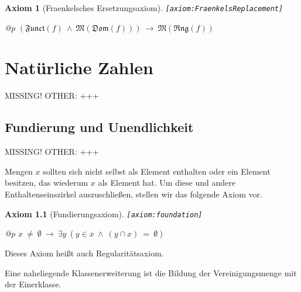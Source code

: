 \documentclass[a4paper,german,10pt,twoside]{book}
\newtheorem{ax}{Axiom}
\theoremstyle{definition}
\theoremstyle{remark}
\begin{document}
\begin{ax}[Fraenkelsches Ersetzungsaxiom]
\label{axiom:FraenkelsReplacement} \hypertarget{axiom:FraenkelsReplacement}{}
{\tt \tiny [\verb]axiom:FraenkelsReplacement]]}
\mbox{}
\begin{longtable}{{@{\extracolsep{\fill}}p{\linewidth}}}
\centering $(\mathfrak{Funct}(f)\ \land\ \mathfrak{M}(\mathfrak{Dom}(f)))\ \rightarrow\ \mathfrak{M}(\mathfrak{Rng}(f))$
\end{longtable}

\end{ax}




\chapter{Nat{\"u}rliche Zahlen} \label{chapter6} \hypertarget{chapter6}{}

MISSING! OTHER: +++

\section{Fundierung und Unendlichkeit} \label{chapter6_section1} \hypertarget{chapter6_section1}{}
MISSING! OTHER: +++

\par
Mengen $x$ sollten sich nicht selbst als Element enthalten oder ein Element besitzen, das wiederum
$x$ als Element hat. Um diese und andere Enthaltenseinszirkel auszuschlie{\ss}en, stellen wir das folgende
Axiom vor.

\begin{ax}[Fundierungsaxiom]
\label{axiom:foundation} \hypertarget{axiom:foundation}{}
{\tt \tiny [\verb]axiom:foundation]]}
\mbox{}
\begin{longtable}{{@{\extracolsep{\fill}}p{\linewidth}}}
\centering $x \ \neq \ \emptyset\ \rightarrow\ \exists y\ (y \in x\ \land\ (y \cap x) \ = \ \emptyset)$
\end{longtable}

\end{ax}

Dieses Axiom hei{\ss}t auch Regularit{\"a}tsaxiom.


\par
Eine naheliegende Klassenerweiterung ist die Bildung der
Vereinigungsmenge mit der Einerklasse.
\end{document}
